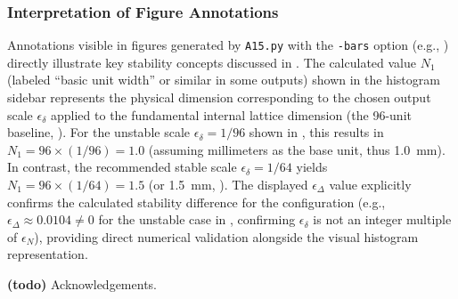 \documentclass[10pt]{article}
\begin{document}
\subsubsection{Interpretation of Figure Annotations}\label{subsubsec:notes-figures}
Annotations visible in figures generated by \texttt{A15.py} with the \texttt{-bars} option (e.g., ) directly illustrate key stability concepts discussed in . The calculated value $N_1$ (labeled ``basic unit width'' or similar in some outputs) shown in the histogram sidebar represents the physical dimension corresponding to the chosen output scale $\epsilon_\delta$ applied to the fundamental internal lattice dimension (the 96-unit baseline, ). For the unstable scale $\epsilon_\delta=1/96$ shown in , this results in $N_1 = 96 \times (1/96) = 1.0$ (assuming millimeters as the base unit, thus \SI{1.0}{\milli\meter}). In contrast, the recommended stable scale $\epsilon_\delta = 1/64$ yields $N_1 = 96 \times (1/64) = 1.5$ (or \SI{1.5}{\milli\meter}, ). The displayed $\epsilon_\Delta$ value explicitly confirms the calculated stability difference for the configuration (e.g., $\epsilon_\Delta \approx \num{0.0104} \neq 0$ for the unstable case in , confirming $\epsilon_\delta$ is not an integer multiple of $\epsilon_N$), providing direct numerical validation alongside the visual histogram representation.


\begin{acknowledgements}

  \textbf{(todo)} Acknowledgements.

\end{acknowledgements}




\end{document}
